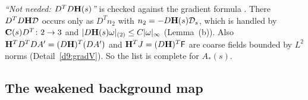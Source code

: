 \begin{detail}\label{d9:closing}
\emph{``Not needed: $D^TD\mathbf H(s)$''} is checked against the gradient formula . There $D^TD\mathbf H\mathcal D$ occurs only as $D^Tn_2$ with $n_2=-D\mathbf H(s)\mathcal D_s$, which is handled by $\mathbf C(s)D^T\colon2\to3$ and $|D\mathbf H(s)\omega|_{(2)}\le C|\omega|_\infty$ (Lemma~(b)). Also $\mathbf H^TD^TDA'=(D\mathbf H)^T(DA')$ and $\mathbf H^TJ=(D\mathbf H)^T\mathsf F$ are coarse fields bounded by $L^2$ norms (Detail~\ref{d9:gradV}). So the list is complete for $A_*(s)$.
\end{detail}

\subsection{The weakened background map}\label{d9:bg}

